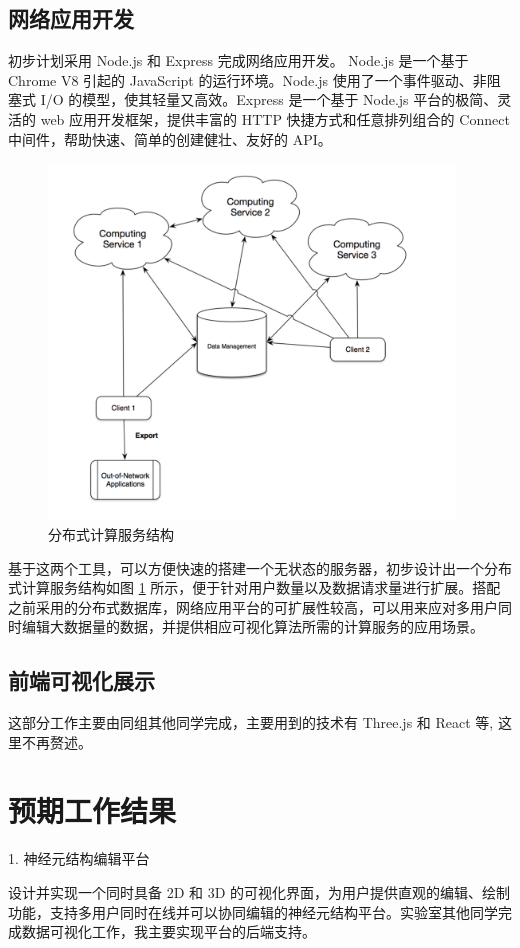 \subsection{网络应用开发}
初步计划采用 Node.js 和 Express 完成网络应用开发。
Node.js 是一个基于 Chrome V8 引起的 JavaScript 的运行环境。Node.js 使用了一个事件驱动、非阻塞式 I/O 的模型，使其轻量又高效。Express 是一个基于 Node.js 平台的极简、灵活的 web 应用开发框架，提供丰富的 HTTP 快捷方式和任意排列组合的 Connect 中间件，帮助快速、简单的创建健壮、友好的 API。
\begin{figure}
\centering
\includegraphics[width=108mm]{images/server}
\caption{分布式计算服务结构}
\label{server}
\end{figure}
基于这两个工具，可以方便快速的搭建一个无状态的服务器，初步设计出一个分布式计算服务结构如图 \ref{server} 所示，便于针对用户数量以及数据请求量进行扩展。搭配之前采用的分布式数据库，网络应用平台的可扩展性较高，可以用来应对多用户同时编辑大数据量的数据，并提供相应可视化算法所需的计算服务的应用场景。

\subsection{前端可视化展示}
这部分工作主要由同组其他同学完成，主要用到的技术有 Three.js 和 React 等, 这里不再赘述。 

\section{预期工作结果}
1. 神经元结构编辑平台

设计并实现一个同时具备 2D 和 3D 的可视化界面，为用户提供直观的编辑、绘制功能，支持多用户同时在线并可以协同编辑的神经元结构平台。实验室其他同学完成数据可视化工作，我主要实现平台的后端支持。

